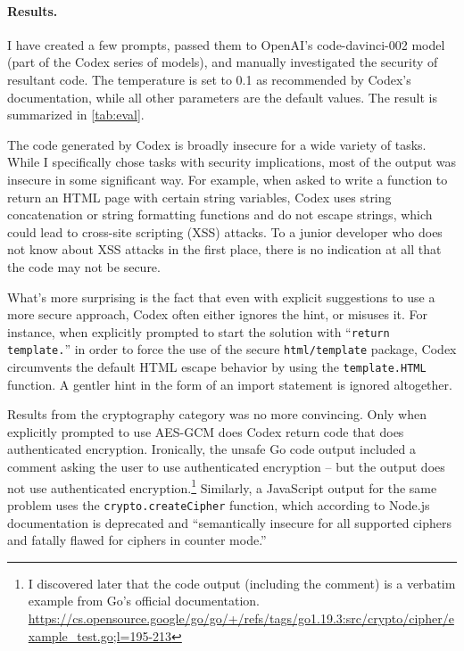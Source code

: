 \documentclass[10pt,sigplan,screen,nonacm]{acmart}
\begin{document}
\paragraph{Results.}
I have created a few prompts, passed them to Open\-AI's \textsf{code-\allowbreak{}da\-vinci-\allowbreak{}002} model (part of the Codex series of models), and manually investigated the security of resultant code. The temperature is set to 0.1 as recommended by Codex's documentation, while all other parameters are the default values. The result is summarized in \autoref{tab:eval}.

The code generated by Codex is broadly insecure for a wide variety of tasks. While I specifically chose tasks with security implications, most of the output was insecure in some significant way. For example, when asked to write a function to return an HTML page with certain string variables, Codex uses string concatenation or string formatting functions and do not escape strings, which could lead to cross-site scripting (XSS) attacks. To a junior developer who does not know about XSS attacks in the first place, there is no indication at all that the code may not be secure.

What's more surprising is the fact that even with explicit suggestions to use a more secure approach, Codex often either ignores the hint, or misuses it. For instance, when explicitly prompted to start the solution with ``\texttt{return\allowbreak{} tem\-plate.}'' in order to force the use of the secure \texttt{html/tem\-plate} package, Codex circumvents the default HTML escape behavior by using the \texttt{tem\-plate.HTML} function. A gentler hint in the form of an import statement is ignored altogether.

Results from the cryptography category was no more convincing. Only when explicitly prompted to use AES-GCM does Codex return code that does authenticated encryption. Ironically, the unsafe Go code output included a comment asking the user to use authenticated encryption -- but the output does not use authenticated encryption.\footnote{I discovered later that the code output (including the comment) is a verbatim example from Go's official documentation. \url{https://cs.opensource.google/go/go/+/refs/tags/go1.19.3:src/crypto/cipher/example_test.go;l=195-213}} Similarly, a JavaScript output for the same problem uses the \texttt{crypto.\allowbreak{}create\-Cipher} function, which according to Node.js documentation is deprecated and ``semantically insecure for all supported ciphers and fatally flawed for ciphers in counter mode.''
\end{document}
